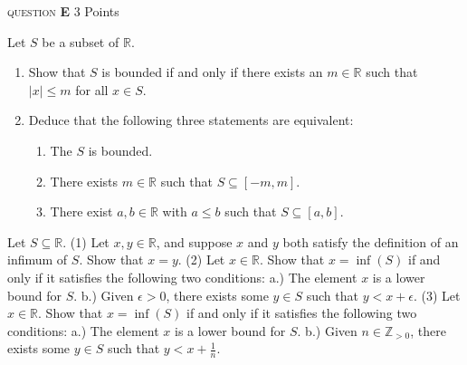 \documentclass[11pt]{article}
\newcommand{\problem
}[2]{
\begin{mdframed}
    \textsc{question} \textbf{#1} \hfill #2
\end{mdframed}
}
\begin{document}
\begin{enumerate}
	      \problem{E}{3 Points}
	      Let $S$ be a subset of $\mathbb{R}$.
	      \begin{enumerate}
		      \item     Show that $S$ is bounded if and only if there exists an $m \in \mathbb{R}$ such that $|x| \leq m$ for all $x \in S$.
		      \item  Deduce that the following three statements are equivalent:
		            \begin{enumerate}
			            \item The $S$ is bounded.
			            \item There exists $m \in \mathbb{R}$ such that $S \subseteq[-m, m]$.
			            \item There exist $a, b \in \mathbb{R}$ with $a \leq b$ such that $S \subseteq[a, b]$.
		            \end{enumerate}
	      \end{enumerate}

	      Let $S \subseteq \mathbb{R}$.
	      (1) Let $x, y \in \mathbb{R}$, and suppose $x$ and $y$ both satisfy the definition of an infimum of $S$. Show that $x=y$.
	      (2) Let $x \in \mathbb{R}$. Show that $x=\inf (S)$ if and only if it satisfies the following two conditions:
	      a.) The element $x$ is a lower bound for $S$.
	      b.) Given $\epsilon>0$, there exists some $y \in S$ such that $y<x+\epsilon$.
	      (3) Let $x \in \mathbb{R}$. Show that $x=\inf (S)$ if and only if it satisfies the following two conditions:
	      a.) The element $x$ is a lower bound for $S$.
	      b.) Given $n \in \mathbb{Z}_{>0}$, there exists some $y \in S$ such that $y<x+\frac{1}{n}$.
\end{enumerate}
\end{document}
